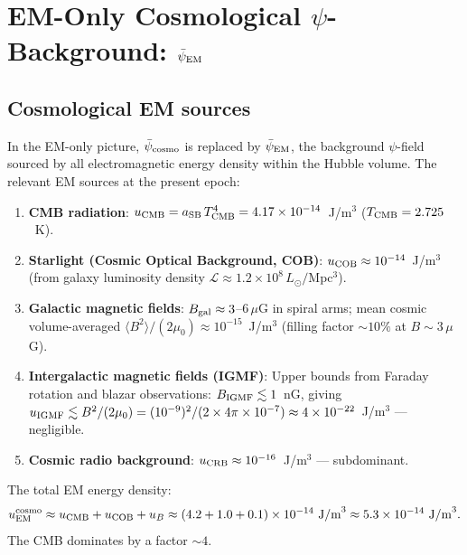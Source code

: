 \documentclass[11pt]{article}
\newcommand{\ee}[1]{\times 10^{#1}}
\newcommand{\psicosmo}{\bar{\psi}_{\rm cosmo}}
\newcommand{\psiEM}{\bar{\psi}_{\rm EM}}
\begin{document}
\section{EM-Only Cosmological $\psi$-Background: $\psiEM$}
\label{sec:psi-EM}

\subsection{Cosmological EM sources}

In the EM-only picture, $\psicosmo$ is replaced by $\psiEM$, the
background $\psi$-field sourced by all electromagnetic energy density
within the Hubble volume. The relevant EM sources at the present epoch:

\begin{enumerate}[label=(\alph*)]
  \item \textbf{CMB radiation}: $u_{\rm CMB} = a_{\rm SB}\,T_{\rm CMB}^4
    = 4.17\ee{-14}$~J/m$^3$ ($T_{\rm CMB} = 2.725$~K).
  \item \textbf{Starlight (Cosmic Optical Background, COB)}: $u_{\rm COB}
    \approx 10^{-14}$~J/m$^3$ (from galaxy luminosity density
    $\mathcal{L} \approx 1.2\ee{8}\,L_\odot/$Mpc$^3$).
  \item \textbf{Galactic magnetic fields}: $B_{\rm gal} \approx 3$--$6\,\mu$G
    in spiral arms; mean cosmic volume-averaged $\langle B^2\rangle/(2\mu_0)
    \approx 10^{-15}$~J/m$^3$ (filling factor $\sim 10\%$ at
    $B \sim 3\,\mu$G).
  \item \textbf{Intergalactic magnetic fields (IGMF)}: Upper bounds from
    Faraday rotation and blazar observations: $B_{\rm IGMF} \lesssim
    1$~nG, giving $u_{\rm IGMF} \lesssim B^2/(2\mu_0) = (10^{-9})^2/(2\times
    4\pi\ee{-7}) \approx 4\ee{-22}$~J/m$^3$ --- negligible.
  \item \textbf{Cosmic radio background}: $u_{\rm CRB} \approx 10^{-16}$~J/m$^3$
    --- subdominant.
\end{enumerate}

\noindent The total EM energy density:
\begin{equation}\label{eq:u-EM-total}
  u_{\rm EM}^{\rm cosmo} \approx u_{\rm CMB} + u_{\rm COB} + u_B
  \approx (4.2 + 1.0 + 0.1)\ee{-14}~\text{J/m}^3
  \approx 5.3\ee{-14}~\text{J/m}^3.
\end{equation}
The CMB dominates by a factor $\sim 4$.
\end{document}
